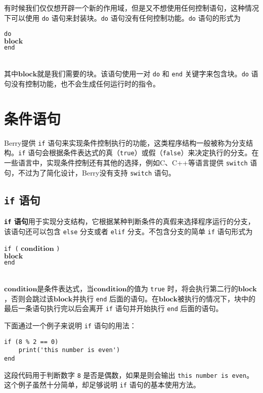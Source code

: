 有时候我们仅仅想开辟一个新的作用域，但是又不想使用任何控制语句，这种情况下可以使用 \texttt{do} 语句来封装块。\texttt{do} 语句没有任何控制功能。\texttt{do} 语句的形式为
\begin{algorithm}
    \texttt{do}\\
    \qquad $\bm{block}$ \\
    \texttt{end}
\end{algorithm}\vspace{-0.6em}\\
其中$\bm{block}$就是我们需要的块。该语句使用一对 \texttt{do} 和 \texttt{end} 关键字来包含块。\texttt{do} 语句没有控制功能，也不会生成任何运行时的指令。

\section{条件语句}

Berry提供 \texttt{if} 语句来实现条件控制执行的功能，这类程序结构一般被称为分支结构。\texttt{if} 语句会根据条件表达式的真（\texttt{true}）或假（\texttt{false}）来决定执行的分支。在一些语言中，实现条件控制还有其他的选择，例如C、C++等语言提供 \texttt{switch} 语句，不过为了简化设计，Berry没有支持 \texttt{switch} 语句。

\subsection{\texttt{if} 语句}

\textbf{\texttt{if} 语句}用于实现分支结构，它根据某种判断条件的真假来选择程序运行的分支，该语句还可以包含 \texttt{else} 分支或者 \texttt{elif} 分支。不包含分支的简单 \texttt{if} 语句形式为
\begin{algorithm}
    \texttt{if (} $\bm{condition}$ \texttt{)} \\
    \qquad $\bm{block}$ \\
    \texttt{end}
\end{algorithm}\vspace{-0.6em}\\
$\bm{condition}$是条件表达式，当$\bm{condition}$的值为 \texttt{true} 时，将会执行第二行的$\bm{block}$，否则会跳过该$\bm{block}$并执行 \texttt{end} 后面的语句。在$\bm{block}$被执行的情况下，块中的最后一条语句执行完以后会离开 \texttt{if} 语句并开始执行 \texttt{end} 后面的语句。

下面通过一个例子来说明 \texttt{if} 语句的用法：
\begin{lstlisting}[language=berry, numbers=none]
if (8 % 2 == 0)
    print('this number is even')
end
\end{lstlisting}
这段代码用于判断数字 \texttt{8} 是否是偶数，如果是则会输出 \texttt{this number is even}。这个例子虽然十分简单，却足够说明 \texttt{if} 语句的基本使用方法。

